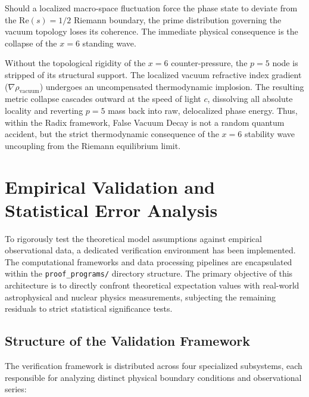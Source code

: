 \documentclass[11pt,a4paper]{article}
\theoremstyle{plain}
\theoremstyle{definition}
\theoremstyle{remark}
\begin{document}
Should a localized macro-space fluctuation force the phase state to deviate from the $\text{Re}(s) = 1/2$ Riemann boundary, the prime distribution governing the vacuum topology loses its coherence. The immediate physical consequence is the collapse of the $x=6$ standing wave. 

Without the topological rigidity of the $x=6$ counter-pressure, the $p=5$ node is stripped of its structural support. The localized vacuum refractive index gradient ($\nabla\rho_{\text{vacuum}}$) undergoes an uncompensated thermodynamic implosion. The resulting metric collapse cascades outward at the speed of light $c$, dissolving all absolute locality and reverting $p=5$ mass back into raw, delocalized phase energy. Thus, within the Radix framework, False Vacuum Decay is not a random quantum accident, but the strict thermodynamic consequence of the $x=6$ stability wave uncoupling from the Riemann equilibrium limit.

\newpage
\section{Empirical Validation and Statistical Error Analysis}
\label{sec:error_validation}

To rigorously test the theoretical model assumptions against empirical observational data, a dedicated verification environment has been implemented. The computational frameworks and data processing pipelines are encapsulated within the \texttt{proof\_programs/} directory structure. The primary objective of this architecture is to directly confront theoretical expectation values with real-world astrophysical and nuclear physics measurements, subjecting the remaining residuals to strict statistical significance tests.

\subsection{Structure of the Validation Framework}
The verification framework is distributed across four specialized subsystems, each responsible for analyzing distinct physical boundary conditions and observational series:
\end{document}
